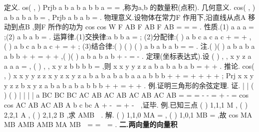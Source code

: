 \textcolor{lyred}{定义}.
\cdot 
os( , )
Prjb
a b
a b
a b
b
a
\cdots 
=
=
\rho 
\rho 
\rho 
\rho 
\rho 
\rho 
\rho 
\rho 
\rho ,称为a\rho ,b
\rho 
的\textcolor{lyred}{数量积(点积)}. 
\textcolor{lyred}{几何意义}.
\cdot 
cos( , )
a b
a b
a b
\cdots 
=
\rho 
\rho 
\rho 
\rho 
\rho 
\rho 
, Prjb
a b
a
b
\cdots 
=
\rho 
\rho 
\rho 
\rho 
\rho . 
\textcolor{lyred}{物理意义}.设物体在常力F
\rho 
作用下,沿直线从点A 移动到点B ,则F
\rho 
所作的功为 
cos
cos
W
F
AB
F AB
F AB
\theta 
\theta 
=
\cdots 
=
=
\cdots 
\xi \xi \xi \rho 
\xi \xi \xi \rho 
\xi \xi \xi \rho 
\rho 
\rho 
\rho 
. 
\textcolor{lyred}{性质}.(1)
a a
a
\cdots 
=
\rho \rho 
\rho ;(2)
a
b
a b
\bot
\Leftrightarrow 
\cdots 
=
\rho 
\rho 
\rho 
\rho 
. 
\textcolor{lyred}{运算律}.(1)\textcolor{lyred}{交换律}:a b
b a
\cdots 
=
\cdots 
\rho 
\rho 
\rho 
\rho ; 
(2)\textcolor{lyred}{分配律}:(
)
a
b
c
a c
a c
+
\cdots 
=
\cdots +
\cdots 
\rho 
\rho 
\rho 
\rho \rho 
\rho \rho ,
(
)
a
b
c
a b
a c
\cdots 
+
=
\cdots 
+
\cdots 
\rho 
\rho 
\rho 
\rho 
\rho 
\rho \rho ; 
(3)\textcolor{lyred}{结合律}:(
)
(
)
(
)
a
b
a
b
a b
\lambda 
\lambda 
\lambda 
\cdots 
=
\cdots 
=
\cdots 
\rho 
\rho 
\rho 
\rho 
\rho 
\rho 
. 
\textcolor{lyred}{注}.(
)(
)
a
b
a
b
a
a b
b
+
\cdots 
+
=
+
\cdots 
+
\rho 
\rho 
\rho 
\rho 
\rho 
\rho 
\rho 
\rho 
,(
)(
)
a
b
a
b
a
b
+
\cdots 
-
=
-
\rho 
\rho 
\rho 
\rho 
\rho 
\rho 
. 
\textcolor{lyred}{定理(坐标表达式)}.设
(
)
,
,
x
y
z
a
a a
a
=
\rho 
,
(
)
,
,
x
y
z
b
b b b
=
\rho 
,则
x
x
y
y
z
z
a b
a b
a b
a b
\cdots 
=
+
+
\rho 
\rho 
. 
\textcolor{lyred}{推论}.
\cdot 
cos( , )
x
x
y
y
z
z
x
y
z
x
y
z
a b
a b
a b
a b
a
a
a
b
b
b
+
+
=
+
+
+
+
\rho 
\rho 
;
Prj
x
x
y
y
z
z
b
x
y
z
a b
a b
a b
a
b
b
b
+
+
=
+
+
\rho \rho 
. 
\textcolor{lyred}{例}.证明三角形的余弦定理. 
证.
|
|
(
) (
) |
|
|
|
a
BC
BC BC
AC
AB
AC
AB
AC
AB
AC AB
=
=
\cdots 
=
-
\cdots 
-
=
+
-
\cdots 
=
\xi \xi \xi \rho 
\xi \xi \xi \rho \xi \xi \xi \rho 
\xi \xi \xi \rho 
\xi \xi \xi \rho 
\xi \xi \xi \rho 
\xi \xi \xi \rho 
\xi \xi \xi \rho 
\xi \xi \xi \rho 
\xi \xi \xi \rho \xi \xi \xi \rho 
cos
cos
AC
AB
AC AB
A
b
c
bc
A
+
-
=
+
-

\xi \xi \xi \rho 
\xi \xi \xi \rho 
\xi \xi \xi \rho \xi \xi \xi \rho 
,证毕. 
\textcolor{lyred}{例}.已知三点
(
)
1,1,1
M
,
(
)
2,2,1
A
,
(
)
2,1,2
B
,求
AMB

. 
解.
(
)
1,1,0
MA =
\xi \xi \xi \rho 
,
(
)
1,0,1
MB =
\xi \xi \xi \rho 
,故
cos
MA MB
AMB
AMB
MA MB
\pi 
\cdots 

=
=
\Rightarrow 
=
\xi \xi \xi \rho \xi \xi \xi \rho 
\xi \xi \xi \rho \xi \xi \xi \rho 
. 
\vspace{4pt}
{\bfseries \textcolor{lyred}{二.两向量的向量积}}

